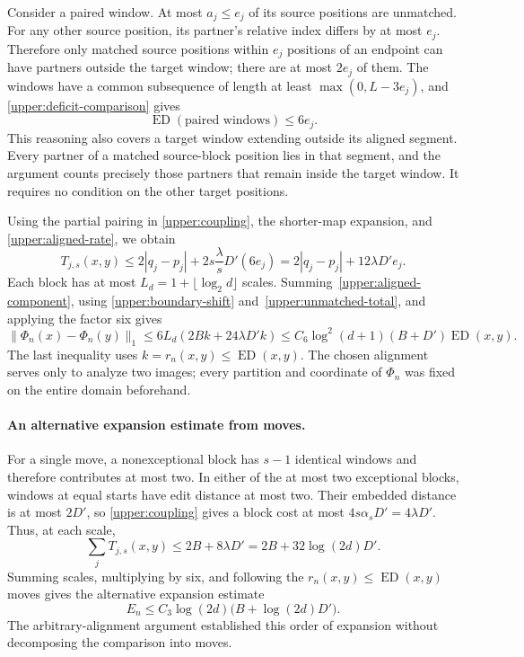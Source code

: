 Consider a paired window.  At most $a_j\le e_j$ of its source
positions are unmatched.  For any other source position, its
partner's relative index differs by at most $e_j$.  Therefore only
matched source positions within $e_j$ positions of an endpoint can
have partners outside the target window; there are at most $2e_j$
of them.  The windows have a common subsequence of length at least
$\max(0,L-3e_j)$, and \eqref{upper:deficit-comparison} gives
\begin{equation}\label{upper:aligned-window}
 \operatorname{ED}(\text{paired windows})\le6e_j.
\end{equation}
This reasoning also covers a target window extending outside its aligned
segment.  Every partner of a matched source-block position lies in that
segment, and the argument counts precisely those partners that remain
inside the target window.  It requires no condition on the other
target positions.

Using the partial pairing in \eqref{upper:coupling}, the shorter-map
expansion, and \eqref{upper:aligned-rate}, we obtain
\begin{equation}\label{upper:aligned-component}
 T_{j,s}(x,y)
 \le2|q_j-p_j|+2s\frac{\lambda}{s}D'(6e_j)
 =2|q_j-p_j|+12\lambda D'e_j.
\end{equation}
Each block has at most $L_d=1+\lfloor\log_2d\rfloor$ scales.
Summing~\eqref{upper:aligned-component}, using
\eqref{upper:boundary-shift} and~\eqref{upper:unmatched-total}, and
applying the factor six gives
\[
 \|\Phi_n(x)-\Phi_n(y)\|_1
 \le6L_d(2Bk+24\lambda D'k)
 \le C_6\log^2(d+1)(B+D')\operatorname{ED}(x,y).
\]
The last inequality uses $k=r_n(x,y)\le\operatorname{ED}(x,y)$.
The chosen alignment serves only to analyze two images; every partition
and coordinate of $\Phi_n$ was fixed on the entire domain beforehand.

\paragraph{An alternative expansion estimate from moves.}
For a single move, a nonexceptional block has $s-1$ identical windows
and therefore contributes at most two. In either of the at most two
exceptional blocks, windows at equal starts have edit distance at most
two. Their embedded distance is at most $2D'$, so
\eqref{upper:coupling} gives a block cost at most $4s\alpha_sD'=4\lambda D'$.
Thus, at each scale,
\begin{equation}\label{upper:ed-move}
 \sum_jT_{j,s}(x,y)\le2B+8\lambda D'
 =2B+32\log(2d)D'.
\end{equation}
Summing scales, multiplying by six, and following the
$r_n(x,y)\le\operatorname{ED}(x,y)$ moves gives the alternative expansion estimate
\begin{equation}\label{upper:ed-move-recurrence}
 E_n\le C_3\log(2d)\bigl(B+\log(2d)D'\bigr).
\end{equation}
The arbitrary-alignment argument established this order of expansion
without decomposing the comparison into moves.

